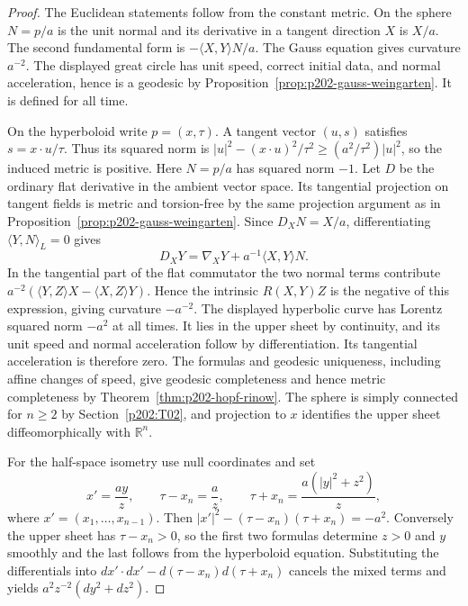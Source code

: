 \documentclass[11pt,oneside,openany]{book}
\theoremstyle{plain}
\theoremstyle{definition}
\theoremstyle{remark}
\newcommand{\R}{\mathbb R}
\begin{document}
\begin{proof}
The Euclidean statements follow from the constant metric.
On the sphere \(N=p/a\) is the unit normal and its derivative in
a tangent direction \(X\) is \(X/a\). The second fundamental form
is \(-\langle X,Y\rangle N/a\). The Gauss equation gives curvature
\(a^{-2}\). The displayed great circle has unit speed, correct
initial data, and normal acceleration, hence is a geodesic by
Proposition~\ref{prop:p202-gauss-weingarten}. It is defined for
all time.

On the hyperboloid write \(p=(x,\tau)\). A tangent vector
\((u,s)\) satisfies \(s=x\cdot u/\tau\). Thus its squared norm
is \(\lvert u\rvert^2-(x\cdot u)^2/\tau^2\ge
(a^2/\tau^2)\lvert u\rvert^2\), so the induced metric is positive.
Here \(N=p/a\) has squared norm \(-1\).
Let \(D\) be the ordinary flat derivative in the ambient
vector space. Its tangential projection on tangent fields
is metric and torsion-free by the same projection argument as
in Proposition~\ref{prop:p202-gauss-weingarten}.
Since \(D_XN=X/a\), differentiating \(\langle Y,N\rangle_L=0\)
gives
\[
 D_XY=\nabla_XY+a^{-1}\langle X,Y\rangle N .
\]
In the tangential part of the flat commutator the two normal
terms contribute
\(a^{-2}(\langle Y,Z\rangle X-\langle X,Z\rangle Y)\).
Hence the intrinsic \(R(X,Y)Z\) is the negative of this
expression, giving curvature \(-a^{-2}\).
The displayed hyperbolic curve has Lorentz squared norm \(-a^2\)
at all times. It lies in the upper sheet by continuity, and
its unit speed and normal acceleration follow by differentiation.
Its tangential acceleration is therefore zero. The formulas and
geodesic uniqueness, including affine changes of speed, give
geodesic completeness and hence metric completeness by
Theorem~\ref{thm:p202-hopf-rinow}.
The sphere is simply connected for \(n\ge2\) by
Section~\ref{p202:T02}, and projection to \(x\) identifies the
upper sheet diffeomorphically with \(\R^n\).

For the half-space isometry use null coordinates and set
\[
 x'=\frac{a y}{z},\qquad
 \tau-x_n=\frac{a}{z},\qquad
 \tau+x_n=\frac{a(\lvert y\rvert^2+z^2)}{z},
\]
where \(x'=(x_1,\ldots,x_{n-1})\).
Then \(\lvert x'\rvert^2-(\tau-x_n)(\tau+x_n)=-a^2\).
Conversely the upper sheet has \(\tau-x_n>0\), so the first two
formulas determine \(z>0\) and \(y\) smoothly and the last
follows from the hyperboloid equation. Substituting the
differentials into
\(dx'\cdot dx'-d(\tau-x_n)d(\tau+x_n)\) cancels the mixed terms
and yields \(a^2z^{-2}(dy^2+dz^2)\).
\end{proof}
\end{document}

